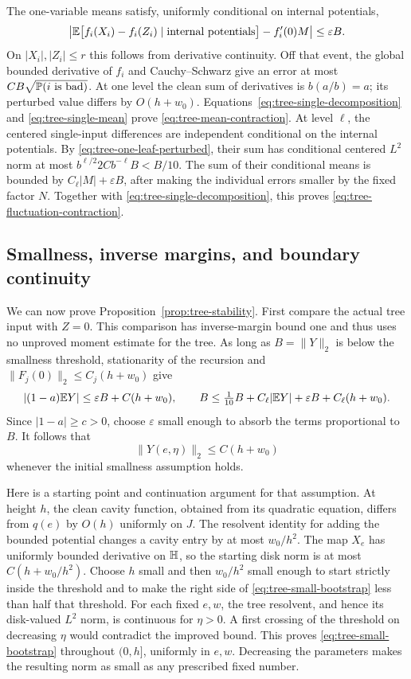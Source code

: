 The one-variable means satisfy, uniformly conditional on internal
potentials,
\begin{equation}\label{eq:tree-single-mean}
 \left|\mathbb E\bigl[f_i(X_i)-f_i(Z_i)\mid\text{internal potentials}\bigr]
                  -f_i'(0)M\right|\le\varepsilon B.
\end{equation}
On $|X_i|,|Z_i|\le r$ this follows from derivative continuity.
Off that event, the global bounded derivative of $f_i$ and
Cauchy--Schwarz give an error at most
$CB\sqrt{\mathbb P(i\text{ is bad})}$.  At one level the clean sum of
derivatives is $b(a/b)=a$; its perturbed value differs by
$O(h+w_0)$.  Equations~\eqref{eq:tree-single-decomposition} and
\eqref{eq:tree-single-mean} prove
\eqref{eq:tree-mean-contraction}.
At level $\ell$, the centered single-input differences are independent
conditional on the internal potentials.  By
\eqref{eq:tree-one-leaf-perturbed}, their sum has conditional centered
$L^2$ norm at most
$b^{\ell/2}2Cb^{-\ell}B<B/10$.  The sum of their conditional means
is bounded by $C_\ell|M|+\varepsilon B$, after making the individual
errors smaller by the fixed factor $N$.  Together with
\eqref{eq:tree-single-decomposition}, this proves
\eqref{eq:tree-fluctuation-contraction}.

\subsection{Smallness, inverse margins, and boundary continuity}

We can now prove Proposition~\ref{prop:tree-stability}.  First compare
the actual tree input with $Z=0$.  This comparison has inverse-margin
bound one and thus uses no unproved moment estimate for the tree.
As long as $B=\|Y\|_2$ is below the smallness threshold,
stationarity of the recursion and $\|F_j(0)\|_2\le C_j(h+w_0)$ give
\[
 |(1-a)\mathbb E Y|\le\varepsilon B+C(h+w_0),\qquad
 B\le\tfrac1{10}B+C_\ell|\mathbb E Y|+\varepsilon B+C_\ell(h+w_0).
\]
Since $|1-a|\ge c>0$, choose $\varepsilon$ small enough to absorb
the terms proportional to $B$.  It follows that
\begin{equation}\label{eq:tree-small-bootstrap}
 \|Y(e,\eta)\|_2\le C(h+w_0)
\end{equation}
whenever the initial smallness assumption holds.

Here is a starting point and continuation argument for that assumption.
At height $h$, the clean cavity function, obtained from its quadratic
equation, differs from $q(e)$ by $O(h)$ uniformly on $J$.  The resolvent
identity for adding the bounded potential changes a cavity entry by
at most $w_0/h^2$.  The map $X_e$ has uniformly bounded derivative
on $\mathbb H$, so the starting disk norm is at most $C(h+w_0/h^2)$.
Choose $h$ small and then $w_0/h^2$ small enough to start strictly
inside the threshold and to make the right side of
\eqref{eq:tree-small-bootstrap} less than half that threshold.
For each fixed $e,w$, the tree resolvent, and hence its disk-valued
$L^2$ norm, is continuous for $\eta>0$.  A first crossing of the
threshold on decreasing $\eta$ would contradict the improved bound.
This proves \eqref{eq:tree-small-bootstrap} throughout $(0,h]$,
uniformly in $e,w$.  Decreasing the parameters makes the resulting
norm as small as any prescribed fixed number.

